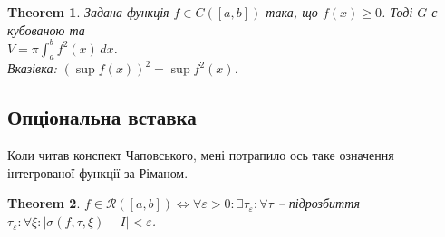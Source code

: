 \documentclass[a4paper, 10pt]{article}
\def\huge{\displaystyle}
\theoremstyle{theoremdd}
\newtheorem{theorem}{Theorem}[subsection]
\theoremstyle{theoremdd}
\theoremstyle{theoremdd}
\theoremstyle{theoremdd}
\theoremstyle{theoremdd}
\theoremstyle{theoremdd}
\theoremstyle{theoremdd}
\theoremstyle{theoremdd}
\theoremstyle{theoremdd}
\begin{document}
\begin{theorem}
Задана функція $f \in C([a,b])$ така, що $f(x) \geq 0$. Тоді $G$ є кубованою та \\ $V = \pi \huge\int_a^b f^2(x)\,dx$.\\
\textit{Вказівка: $\huge (\sup f(x))^2 = \sup f^2 (x)$.}
\end{theorem}
\newpage

\subsection*{Опціональна вставка}
Коли читав конспект Чаповського, мені потрапило ось таке означення інтегрованої функції за Ріманом.
\begin{theorem}
$f \in \mathcal{R}([a,b]) \iff \forall \varepsilon > 0: \exists \tau_\varepsilon: \forall \tau$ -- підрозбиття $\tau_\varepsilon: \forall \xi: |\sigma(f,\tau,\xi) - I| < \varepsilon$.
\end{theorem}
\end{document}
